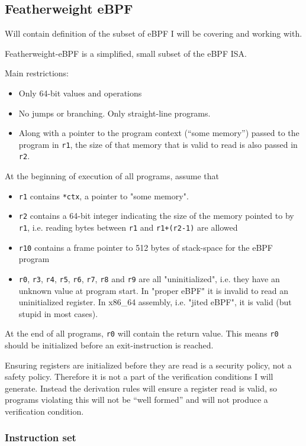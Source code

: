 \subsection{Featherweight eBPF}
\label{subsec:featherweight_ebpf}
Will contain definition of the subset of eBPF I will be covering and working with.


Featherweight-eBPF is a simplified, small subset of the eBPF ISA.

Main restrictions:
\begin{itemize}
\item Only 64-bit values and operations
\item No jumps or branching. Only straight-line programs.
\item Along with a pointer to the program context (``some memory'') passed to the program in \texttt{r1}, the size of that memory that is valid to read is also passed in \texttt{r2}. 
\end{itemize}


At the beginning of execution of all programs, assume that
\begin{itemize}
\item \texttt{r1} contains \texttt{*ctx}, a pointer to "some memory".
\item \texttt{r2} contains a 64-bit integer indicating the size of the memory pointed to by \texttt{r1}, i.e. reading bytes between \texttt{r1} and \texttt{r1+(r2-1)} are allowed
\item \texttt{r10} contains a frame pointer to 512 bytes of stack-space for the eBPF program
\item \texttt{r0}, \texttt{r3}, \texttt{r4}, \texttt{r5}, \texttt{r6}, \texttt{r7}, \texttt{r8} and \texttt{r9} are all "uninitialized", i.e. they have an unknown value at program start. In "proper eBPF" it is invalid to read an uninitialized register. In x86\_64 assembly, i.e. "jited eBPF", it is valid (but stupid in most cases).

\end{itemize}

At the end of all programs, \texttt{r0} will contain the return value. 
This means \texttt{r0} should be initialized before an exit-instruction is reached.

Ensuring registers are initialized before they are read is a security policy, not a safety policy.
Therefore it is not a part of the verification conditions I will generate. Instead the derivation rules will ensure a register read is valid, so programs violating this will not be ``well formed'' and will not produce a verification condition. 

\subsubsection*{Instruction set}

